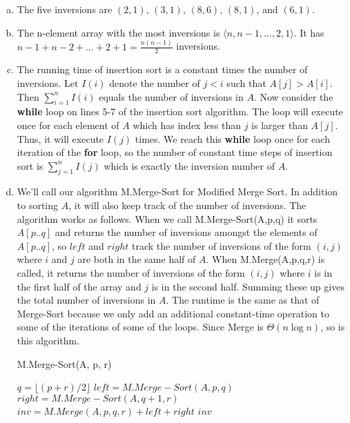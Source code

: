 \documentclass{article}
\begin{document}
\begin{enumerate}[a.]
\item The five inversions are $(2,1)$, $(3,1)$, $(8,6)$, $(8,1)$, and $(6,1)$. \\

\item The n-element array with the most inversions is $\langle n, n-1, \ldots, 2, 1 \rangle$.  It has $n-1 + n-2 + \ldots + 2 + 1 = \frac{n(n-1)}{2}$ inversions. \\

\item The running time of insertion sort is a constant times the number of inversions.  Let $I(i)$ denote the number of $j < i$ such that $A[j] > A[i]$.  Then $\sum_{i=1}^n I(i)$ equals the number of inversions in $A$.  Now consider the \textbf{while} loop on lines 5-7 of the insertion sort algorithm.  The loop will execute once for each element of $A$ which has index less than $j$ is larger than $A[j]$.  Thus, it will execute $I(j)$ times.  We reach this \textbf{while} loop once for each iteration of the \textbf{for} loop, so the number of constant time steps of insertion sort is $\sum_{j=1}^n I(j)$ which is exactly the inversion number of $A$.  \\

\item We'll call our algorithm M.Merge-Sort for Modified Merge Sort.  In addition to sorting $A$, it will also keep track of the number of inversions.  The algorithm works as follows.  When we call M.Merge-Sort(A,p,q) it sorts $A[p..q]$ and returns the number of inversions amongst the elements of $A[p..q]$, so $left$ and $right$ track the number of inversions of the form $(i,j)$ where $i$ and $j$ are both in the same half of $A$.  When M.Merge(A,p,q,r) is called, it returns the number of inversions of the form $(i,j)$ where $i$ is in the first half of the array and $j$ is in the second half.  Summing these up gives the total number of inversions in $A$.  The runtime is the same as that of Merge-Sort because we only add an additional constant-time operation to some of the iterations of some of the loops.  Since Merge is $\Theta(n \log n)$, so is this algorithm.

\begin{algorithm}
\caption{M.Merge-Sort(A, p, r)}
\begin{algorithmic}
	\State $q = \lfloor(p+r)/2\rfloor$
	\State $left = M.Merge-Sort(A,p,q)$
	\State $right = M.Merge-Sort(A,q+1,r)$
	\State $inv = M.Merge(A,p,q,r) + left + right$
	\State \Return $inv$
\EndIf
\State {}
\end{algorithmic}
\end{algorithm}


\end{enumerate}
\end{document}
